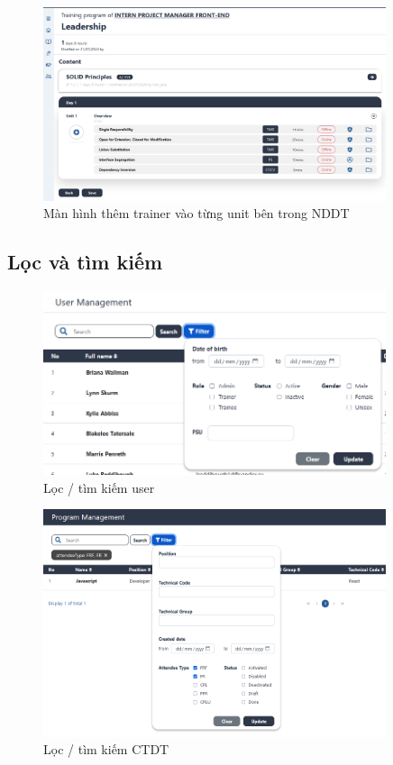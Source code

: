 \documentclass[report.tex]{subfiles}
\begin{document}
\begin{figure}[!htb]
{\centering
\includegraphics[width=380px]{../meta/ui.class-add-trainer.png}
\caption[Màn hình thêm trainer]{Màn hình thêm trainer vào từng unit bên trong NDDT}
\par
}
\end{figure}
\FloatBarrier

\subsection{Lọc và tìm kiếm}

\begin{figure}[!htb]
{\centering
\includegraphics[width=380px]{../meta/ui.user-filter.png}
\caption{Lọc / tìm kiếm user}
\par
}
\end{figure}
\FloatBarrier

\begin{figure}[!htb]
{\centering
\includegraphics[width=380px]{../meta/ui.program-filter.png}
\caption{Lọc / tìm kiếm CTDT}
\par
}
\end{figure}
\FloatBarrier
\end{document}
